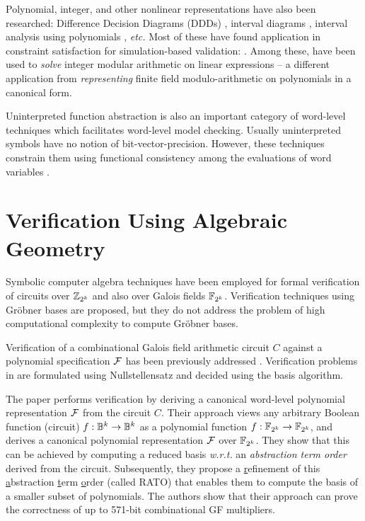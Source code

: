 Polynomial, integer, and other nonlinear representations have also
been researched: Difference Decision Diagrams (DDDs) \cite{ddd-csl99,ddd-mt-98}, interval
diagrams \cite{interval_dd}, interval analysis using polynomials
\cite{polynomial_sanchez99}, {\it etc.} Most of these have found 
application in constraint satisfaction for simulation-based
validation:  \cite{Ritter99,hsat,lpsat,brinkmann:asp-dac,Huang:tcad01,bitvector98}. Among
these, \cite{brinkmann:asp-dac,Huang:tcad01,bitvector98}
have been used to {\it solve} integer modular arithmetic on linear
expressions -- a different application from {\it representing}
finite field modulo-arithmetic on polynomials in a canonical form.   

Uninterpreted function abstraction is also an important category of 
word-level techniques which facilitates word-level model checking.
Usually uninterpreted symbols have no notion of bit-vector-precision. However, these techniques
constrain them 
using functional consistency among the evaluations of word variables
\cite{UF1,UF2,UF3}.


\section{Verification Using Algebraic Geometry}

Symbolic computer algebra techniques have been employed for formal
verification of circuits over ${\mathbb{Z}}_{2^k}$ and also over
Galois fields ${\mathbb{F}}_{2^k}$. 
Verification techniques using Gr\"obner bases
\cite{Avrunin:CAV,gbverify:2007,manna:program} are proposed,
but they do not address the problem of high computational complexity to
compute Gr\"obner bases.

Verification of a combinational Galois field arithmetic circuit $C$ against a
polynomial specification ${\mathcal{F}}$ has been previously addressed 
\cite{ibm:blueveri,lv:tcad2013,pruss:dac14}. Verification problems in
\cite{ibm:blueveri,lv:tcad2013} are formulated using
Nullstellensatz and decided using the \Grobner basis algorithm.

The paper 
\cite{pruss:dac14} performs verification by deriving a canonical
word-level polynomial representation ${\mathcal{F}}$ from the circuit $C$. Their
approach views any arbitrary Boolean function (circuit) $f: {\mathbb{B}}^k
\rightarrow {\mathbb{B}}^k$ as a polynomial function $f: {\mathbb{F}}_{2^k} \rightarrow {\mathbb{F}}_{2^k}$,
and derives a canonical polynomial representation ${\mathcal{F}}$ over
${\mathbb{F}}_{2^k}$. They show that this can be achieved by computing a reduced 
\Grobner basis {\it w.r.t.} an {\it abstraction term order} derived from the
circuit. Subsequently, they propose a \underline{r}efinement of this
\underline{a}bstraction \underline{t}erm \underline{o}rder (called
RATO) that enables them to compute the \Grobner basis of a smaller subset
of polynomials. The authors show that their approach can prove the
correctness of up to 571-bit combinational GF multipliers. 

